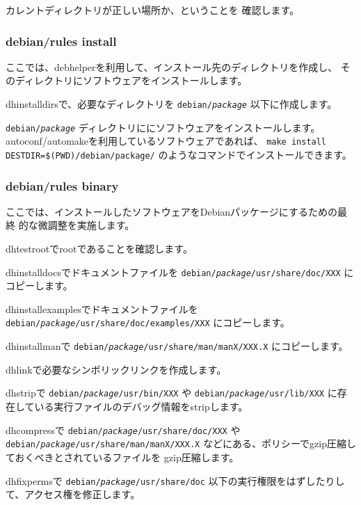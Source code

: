 \documentclass[mingoth]{jsarticle}
\begin{document}
カレントディレクトリが正しい場所か、ということを
確認します。

\subsubsection{debian/rules install}

ここでは、debhelperを利用して、インストール先のディレクトリを作成し、
そのディレクトリにソフトウェアをインストールします。

dh\underbar{ }installdirsで、必要なディレクトリを
{\tt debian/{\it package}}
以下に作成します。

{\tt debian/{\it package}}
ディレクトリににソフトウェアをインストールします。
autoconf/automakeを利用しているソフトウェアであれば、
\verb!make install DESTDIR=$(PWD)/debian/package/!
のようなコマンドでインストールできます。

\subsubsection{debian/rules binary}

ここでは、インストールしたソフトウェアをDebianパッケージにするための最終
的な微調整を実施します。

dh\underbar{ }testrootでrootであることを確認します。

dh\underbar{ }installdocsでドキュメントファイルを
{\tt debian/{\it package}/usr/share/doc/XXX}
にコピーします。

dh\underbar{ }installexamplesでドキュメントファイルを
{\tt debian/{\it package}/usr/share/doc/examples/XXX}
にコピーします。

dh\underbar{ }installmanで
{\tt debian/{\it package}/usr/share/man/manX/XXX.X}
にコピーします。

dh\underbar{ }linkで必要なシンボリックリンクを作成します。

dh\underbar{ }stripで
{\tt debian/{\it package}/usr/bin/XXX}
や
{\tt debian/{\it package}/usr/lib/XXX}
に存在している実行ファイルのデバッグ情報をstripします。

dh\underbar{ }compressで
{\tt debian/{\it package}/usr/share/doc/XXX}
や
{\tt debian/{\it package}/usr/share/man/manX/XXX.X}
などにある、ポリシーでgzip圧縮しておくべきとされているファイルを
gzip圧縮します。

dh\underbar{ }fixpermsで
{\tt debian/{\it package}/usr/share/doc}
以下の実行権限をはずしたりして、アクセス権を修正します。
\end{document}
